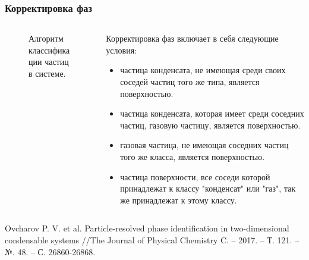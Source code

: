 \documentclass[pdf,hyperref={unicode}]{beamer}
\begin{document}
\begin{frame}
\transdissolve[duration=0.2]
\frametitle{Корректировка фаз}
\begin{columns}

\begin{column}{0.47\linewidth}
{
\begin{figure}[h]
\caption{\tiny Алгоритм классификации частиц в системе.}
\end{figure}
}
\end{column}

\begin{column}{0.47\linewidth}
{\tiny{
Корректировка фаз включает в себя следующие условия:
\begin{itemize}
\item частица конденсата, не имеющая среди своих соседей частиц того же типа, является поверхностью.
\item частица конденсата, которая имеет среди соседних частиц, газовую частицу, является поверхностью.
\item газовая частица, не имеющая соседних частиц того же класса,  является поверхностью.
\item частица поверхности, все соседи которой принадлежат к классу "конденсат" или "газ", так же принадлежат к этому классу.
\end{itemize}
}}
\end{column}

\end{columns}

\vspace{12mm}
\tiny{
Ovcharov P. V. et al. Particle-resolved phase identification in two-dimensional condensable systems //The Journal of Physical Chemistry C. – 2017. – Т. 121. – №. 48. – С. 26860-26868.
}
\end{frame}
\end{document}
